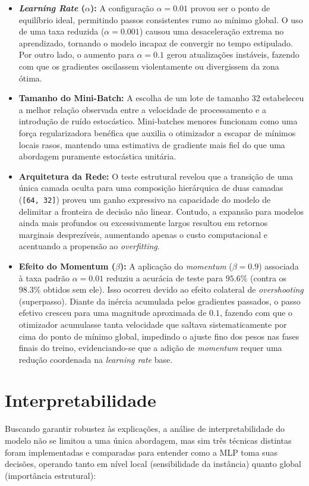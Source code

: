 \documentclass[10pt,a4paper]{article}
\begin{document}
\begin{itemize}
    \item \textbf{\textit{Learning Rate} ($\alpha$):} A configuração $\alpha=0.01$ provou ser o ponto de equilíbrio ideal, permitindo passos consistentes rumo ao mínimo global. O uso de uma taxa reduzida ($\alpha=0.001$) causou uma desaceleração extrema no aprendizado, tornando o modelo incapaz de convergir no tempo estipulado. Por outro lado, o aumento para $\alpha=0.1$ gerou atualizações instáveis, fazendo com que os gradientes oscilassem violentamente ou divergissem da zona ótima.
    
    \item \textbf{Tamanho do Mini-Batch:} A escolha de um lote de tamanho 32 estabeleceu a melhor relação observada entre a velocidade de processamento e a introdução de ruído estocástico. Mini-batches menores funcionam como uma força regularizadora benéfica que auxilia o otimizador a escapar de mínimos locais rasos, mantendo uma estimativa de gradiente mais fiel do que uma abordagem puramente estocástica unitária.
    
    \item \textbf{Arquitetura da Rede:} O teste estrutural revelou que a transição de uma única camada oculta para uma composição hierárquica de duas camadas (\texttt{[64, 32]}) proveu um ganho expressivo na capacidade do modelo de delimitar a fronteira de decisão não linear. Contudo, a expansão para modelos ainda mais profundos ou excessivamente largos resultou em retornos marginais desprezíveis, aumentando apenas o custo computacional e acentuando a propensão ao \textit{overfitting}.
    
    \item \textbf{Efeito do Momentum ($\beta$):} A aplicação do \textit{momentum} ($\beta=0.9$) associada à taxa padrão $\alpha=0.01$ reduziu a acurácia de teste para $95.6\%$ (contra os $98.3\%$ obtidos sem ele). Isso ocorreu devido ao efeito colateral de \textit{overshooting} (superpasso). Diante da inércia acumulada pelos gradientes passados, o passo efetivo cresceu para uma magnitude aproximada de $0.1$, fazendo com que o otimizador acumulasse tanta velocidade que saltava sistematicamente por cima do ponto de mínimo global, impedindo o ajuste fino dos pesos nas fases finais do treino, evidenciando-se que a adição de \textit{momentum} requer uma redução coordenada na \textit{learning rate} base.
\end{itemize}

\section{Interpretabilidade}
Buscando garantir robustez às explicações, a análise de interpretabilidade do modelo não se limitou a uma única abordagem, mas sim três técnicas distintas foram implementadas e comparadas para entender como a MLP toma suas decisões, operando tanto em nível local (sensibilidade da instância) quanto global (importância estrutural):
\end{document}
